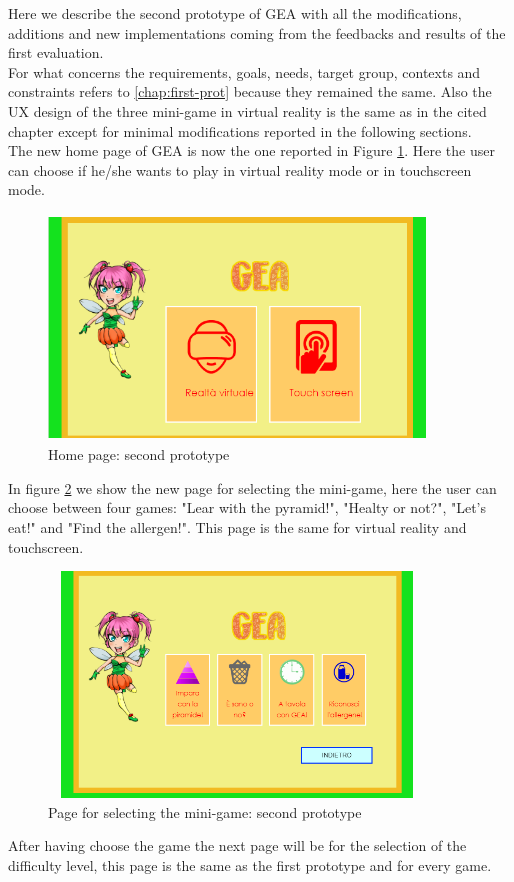 Here we describe the second prototype of GEA with all the modifications, additions and new implementations coming from the feedbacks and results of the first evaluation.\\
For what concerns the requirements, goals, needs, target group, contexts and constraints refers to \autoref{chap:first-prot} because they remained the same. Also the UX design of the three mini-game in virtual reality is the same as in the cited chapter except for minimal modifications reported in the following sections.\\
The new home page of GEA is now the one reported in Figure \ref{fig:newhomepage}. Here the user can choose if he/she wants to play in virtual reality mode or in touchscreen mode. \\
\begin{figure}[H]
\centering
\includegraphics[width=10cm, height=6cm]{immagini/homepagenew.png}
\caption{Home page: second prototype}\label{fig:newhomepage}
\end{figure}
In figure \ref{fig:newselection} we show the new page for selecting the mini-game, here the user can choose between four games: "Lear with the pyramid!", "Healty or not?", "Let's eat!" and "Find the allergen!". This page is the same for virtual reality and touchscreen.
\begin{figure}[H]
\centering
\includegraphics[width=10cm, height=6cm]{immagini/selectionnew.png}
\caption{Page for selecting the mini-game: second prototype}\label{fig:newselection}
\end{figure}
After having choose the game the next page will be for the selection of the difficulty level, this page is the same as the first prototype and for every game.
